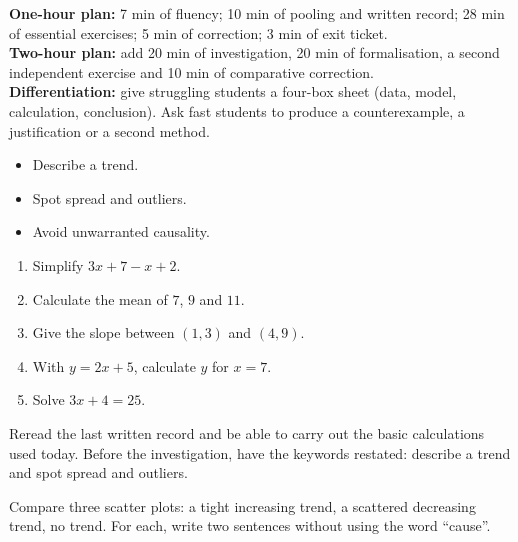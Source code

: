 \ifprof
\begin{methode}
\textbf{One-hour plan:} 7 min of fluency; 10 min of pooling and written record; 28 min of essential exercises; 5 min of correction; 3 min of exit ticket.\\
\textbf{Two-hour plan:} add 20 min of investigation, 20 min of formalisation, a second independent exercise and 10 min of comparative correction.\\
\textbf{Differentiation:} give struggling students a four-box sheet (data, model, calculation, conclusion). Ask fast students to produce a counterexample, a justification or a second method.
\end{methode}
\fi
{}
\begin{objectifs}\begin{itemize}\item Describe a trend.\item Spot spread and outliers.\item Avoid unwarranted causality.\end{itemize}\end{objectifs}
\begin{automatismes}\begin{enumerate}\item Simplify $3x+7-x+2$. \item Calculate the mean of $7$, $9$ and $11$. \item Give the slope between $(1,3)$ and $(4,9)$. \item With $y=2x+5$, calculate $y$ for $x=7$. \item Solve $3x+4=25$. \end{enumerate}\end{automatismes}
\begin{prerequis}Reread the last written record and be able to carry out the basic calculations used today. Before the investigation, have the keywords restated: describe a trend and spot spread and outliers.\end{prerequis}

\begin{activite}
Compare three scatter plots: a tight increasing trend, a scattered decreasing trend, no trend. For each, write two sentences without using the word ``cause''.

\end{activite}

